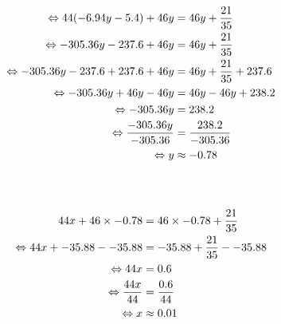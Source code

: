 \documentclass{article}%
\begin{document}
\\%
\ \\%
\vspace{5mm}%
\newline%
\begin{align*}%
\ \Leftrightarrow  44(-6.94y - 5.4) + 46y &= 46y + \frac{21}{35} \\%
\vspace{5mm}%
\newline%
\ \Leftrightarrow  -305.36y - 237.6 + 46y &= 46y + \frac{21}{35} \\%
\vspace{5mm}%
\newline%
\ \Leftrightarrow  -305.36y - 237.6 +237.6 + 46y &= 46y + \frac{21}{35} +237.6 \\%
\vspace{5mm}%
\newline%
\ \Leftrightarrow  -305.36y +46y - 46y &= 46y -46y + 238.2 \\%
\vspace{5mm}%
\newline%
\ \Leftrightarrow  -305.36y &= 238.2 \\%
\vspace{5mm}%
\newline%
\ \Leftrightarrow  \frac{-305.36y}{-305.36} &= \frac{238.2}{-305.36} \\%
\vspace{5mm}%
\newline%
\ \Leftrightarrow y &\approx -0.78 \\%
\vspace{5mm}%
\newline%
\end{align*}%
\ \\%
\vspace{5mm}%
\newline%
\begin{align*}%
\  44x + 46 \times -0.78 &= 46 \times -0.78 + \frac{21}{35} \\%
\vspace{5mm}%
\newline%
\ \Leftrightarrow 44x + -35.88 - -35.88 &= -35.88 +\frac{21}{35} --35.88 \\%
\vspace{5mm}%
\newline%
\ \Leftrightarrow 44x &= 0.6 \\%
\vspace{5mm}%
\newline%
\ \Leftrightarrow \frac{44x}{44} &= \frac{0.6}{44} \\%
\vspace{5mm}%
\newline%
\ \Leftrightarrow x &\approx 0.01 \\%
\vspace{5mm}%
\newline%
\end{align*}

%
\end{document}
